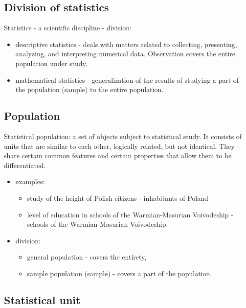 \documentclass[
  english,
  letterpaper,
  DIV=11,
  numbers=noendperiod]{scrreprt}
\providecommand{\tightlist}{%
  \setlength{\itemsep}{0pt}\setlength{\parskip}{0pt}}
\begin{document}
\subsection{Division of statistics}\label{division-of-statistics}

Statistics - a scientific discipline - division:

\begin{itemize}
\tightlist
\item
  descriptive statistics - deals with matters related to collecting,
  presenting, analyzing, and interpreting numerical data. Observation
  covers the entire population under study.
\item
  mathematical statistics - generalization of the results of studying a
  part of the population (sample) to the entire population.
\end{itemize}

\subsection{Population}\label{population}

Statistical population: a set of objects subject to statistical study.
It consists of units that are similar to each other, logically related,
but not identical. They share certain common features and certain
properties that allow them to be differentiated.

\begin{itemize}
\tightlist
\item
  examples:

  \begin{itemize}
  \tightlist
  \item
    study of the height of Polish citizens - inhabitants of Poland
  \item
    level of education in schools of the Warmian-Masurian Voivodeship -
    schools of the Warmian-Masurian Voivodeship.
  \end{itemize}
\item
  division:

  \begin{itemize}
  \tightlist
  \item
    general population - covers the entirety,
  \item
    sample population (sample) - covers a part of the population.
  \end{itemize}
\end{itemize}

\subsection{Statistical unit}\label{statistical-unit}
\end{document}
